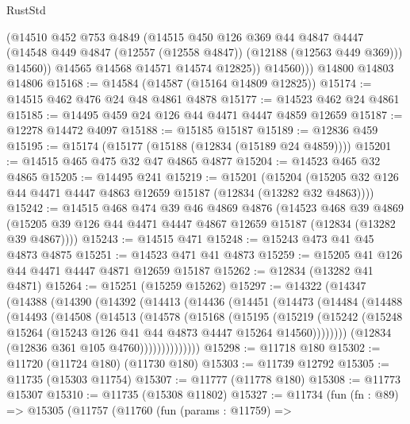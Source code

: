 \begin{lexlean}{RustStd}
\begin{coremodule}
              (@14510
                @452
                @753
                @4849
                (@14515
                  @450
                  @126
                  @369
                  @44
                  @4847
                  @4447
                  (@14548 @449 @4847 (@12557 (@12558 @4847)) (@12188 (@12563 @449 @369)))
                  @14560))
              @14565
              @14568
              @14571
              @14574
              @12825))
          @14560)))
    @14800
    @14803
    @14806
@15168 := @14584 (@14587 (@15164 @14809 @12825))
@15174 := @14515 @462 @476 @24 @48 @4861 @4878
@15177 := @14523 @462 @24 @4861
@15185 := @14495 @459 @24 @126 @44 @4471 @4447 @4859 @12659
@15187 := @12278 @14472 @4097
@15188 := @15185 @15187
@15189 := @12836 @459
@15195 := @15174 (@15177 (@15188 (@12834 (@15189 @24 @4859))))
@15201 := @14515 @465 @475 @32 @47 @4865 @4877
@15204 := @14523 @465 @32 @4865
@15205 := @14495 @241
@15219 := @15201
    (@15204 (@15205 @32 @126 @44 @4471 @4447 @4863 @12659 @15187 (@12834 (@13282 @32 @4863))))
@15242 := @14515
    @468
    @474
    @39
    @46
    @4869
    @4876
    (@14523
      @468
      @39
      @4869
      (@15205 @39 @126 @44 @4471 @4447 @4867 @12659 @15187 (@12834 (@13282 @39 @4867))))
@15243 := @14515 @471
@15248 := @15243 @473 @41 @45 @4873 @4875
@15251 := @14523 @471 @41 @4873
@15259 := @15205 @41 @126 @44 @4471 @4447 @4871 @12659 @15187
@15262 := @12834 (@13282 @41 @4871)
@15264 := @15251 (@15259 @15262)
@15297 := @14322
    (@14347
      (@14388
        (@14390
          (@14392
            (@14413
              (@14436
                (@14451
                  (@14473
                    (@14484
                      (@14488
                        (@14493
                          (@14508
                            (@14513
                              (@14578
                                (@15168
                                  (@15195
                                    (@15219
                                      (@15242
                                        (@15248
                                          @15264
                                          (@15243 @126 @41 @44 @4873 @4447 @15264 @14560))))))))
                            (@12834 (@12836 @361 @105 @4760))))))))))))))
@15298 := @11718 @180
@15302 := @11720 (@11724 @180) (@11730 @180)
@15303 := @11739 @12792
@15305 := @11735 (@15303 @11754)
@15307 := @11777 (@11778 @180)
@15308 := @11773 @15307
@15310 := @11735 (@15308 @11802)
@15327 := @11734
    (fun (fn : @89) =>
    @15305
      (@11757
        (@11760
          (fun (params : @11759) =>

\end{coremodule}
\end{lexlean}
